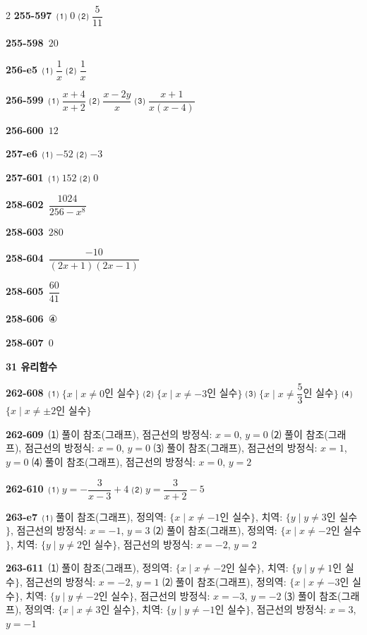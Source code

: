 \documentclass[10pt,a4paper]{article}
\begin{document}
\begin{multicols}{2}
\noindent\textbf{255-597}\ ⑴ $0$ ⑵ $\dfrac{5}{11}$\par
\noindent\textbf{255-598}\ $20$\par
\noindent\textbf{256-e5}\ ⑴ $\dfrac{1}{x}$ ⑵ $\dfrac{1}{x}$\par
\noindent\textbf{256-599}\ ⑴ $\dfrac{x+4}{x+2}$ ⑵ $\dfrac{x-2y}{x}$ ⑶ $\dfrac{x+1}{x(x-4)}$\par
\noindent\textbf{256-600}\ $12$\par
\noindent\textbf{257-e6}\ ⑴ $-52$ ⑵ $-3$\par
\noindent\textbf{257-601}\ ⑴ $152$ ⑵ $0$\par
\noindent\textbf{258-602}\ $\dfrac{1024}{256-x^8}$\par
\noindent\textbf{258-603}\ $280$\par
\noindent\textbf{258-604}\ $\dfrac{-10}{(2x+1)(2x-1)}$\par
\noindent\textbf{258-605}\ $\dfrac{60}{41}$\par
\noindent\textbf{258-606}\ ④\par
\noindent\textbf{258-607}\ $0$\par
\noindent\textbf{31 유리함수}\par\smallskip
\noindent\textbf{262-608}\ ⑴ $\{x \mid x\ne 0$인 실수$\}$ ⑵ $\{x \mid x\ne -3$인 실수$\}$ ⑶ $\{x \mid x\ne \dfrac{5}{3}$인 실수$\}$ ⑷ $\{x \mid x\ne \pm 2$인 실수$\}$\par
\noindent\textbf{262-609}\ ⑴ 풀이 참조(그래프), 점근선의 방정식: $x=0$, $y=0$ ⑵ 풀이 참조(그래프), 점근선의 방정식: $x=0$, $y=0$ ⑶ 풀이 참조(그래프), 점근선의 방정식: $x=1$, $y=0$ ⑷ 풀이 참조(그래프), 점근선의 방정식: $x=0$, $y=2$\par
\noindent\textbf{262-610}\ ⑴ $y=-\dfrac{3}{x-3}+4$ ⑵ $y=\dfrac{3}{x+2}-5$\par
\noindent\textbf{263-e7}\ ⑴ 풀이 참조(그래프), 정의역: $\{x \mid x\ne -1$인 실수$\}$, 치역: $\{y \mid y\ne 3$인 실수$\}$, 점근선의 방정식: $x=-1$, $y=3$ ⑵ 풀이 참조(그래프), 정의역: $\{x \mid x\ne -2$인 실수$\}$, 치역: $\{y \mid y\ne 2$인 실수$\}$, 점근선의 방정식: $x=-2$, $y=2$\par
\noindent\textbf{263-611}\ ⑴ 풀이 참조(그래프), 정의역: $\{x \mid x\ne -2$인 실수$\}$, 치역: $\{y \mid y\ne 1$인 실수$\}$, 점근선의 방정식: $x=-2$, $y=1$ ⑵ 풀이 참조(그래프), 정의역: $\{x \mid x\ne -3$인 실수$\}$, 치역: $\{y \mid y\ne -2$인 실수$\}$, 점근선의 방정식: $x=-3$, $y=-2$ ⑶ 풀이 참조(그래프), 정의역: $\{x \mid x\ne 3$인 실수$\}$, 치역: $\{y \mid y\ne -1$인 실수$\}$, 점근선의 방정식: $x=3$, $y=-1$\par

\end{multicols}
\end{document}
